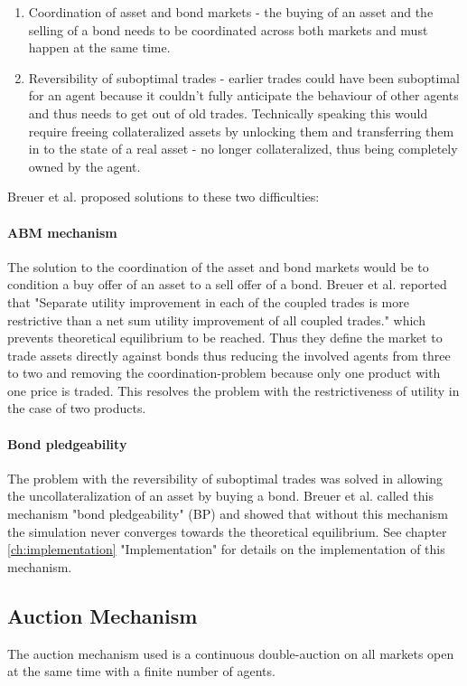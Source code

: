 \documentclass[../Bachelorarbeit.tex]{subfiles}
\begin{document}
\begin{enumerate}
\item Coordination of asset and bond markets - the buying of an asset and the selling of a bond needs to be coordinated across both markets and must happen at the same time.
\item Reversibility of suboptimal trades - earlier trades could have been suboptimal for an agent because it couldn't fully anticipate the behaviour of other agents and thus needs to get out of old trades. Technically speaking this would require freeing collateralized assets by unlocking them and transferring them in to the state of a real asset - no longer collateralized, thus being completely owned by the agent.
\end{enumerate}

Breuer et al. proposed solutions to these two difficulties:
\paragraph{ABM mechanism}
The solution to the coordination of the asset and bond markets would be to condition a buy offer of an asset to a sell offer of a bond. Breuer et al. reported that "Separate utility improvement in each of the coupled trades is more restrictive than a net sum utility improvement of all coupled trades." which prevents theoretical equilibrium to be reached. Thus they define the market to trade assets directly against bonds thus reducing the involved agents from three to two and removing the coordination-problem because only one product with one price is traded. This resolves the problem with the restrictiveness of utility in the case of two products.

\paragraph{Bond pledgeability}
The problem with the reversibility of suboptimal trades was solved in allowing the uncollateralization of an asset by buying a bond. Breuer et al. called this mechanism "bond pledgeability" (BP) and showed that without this mechanism the simulation never converges towards the theoretical equilibrium. See chapter \ref{ch:implementation} "Implementation" for details on the implementation of this mechanism.

\subsection{Auction Mechanism}
The auction mechanism used is a continuous double-auction on all markets open at the same time with a finite number of agents.
\end{document}
